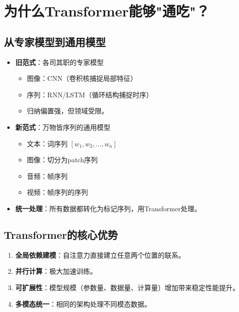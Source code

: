 \section{为什么Transformer能够"通吃"？}

\subsection{从专家模型到通用模型}

\begin{itemize}
    \item \textbf{旧范式}：各司其职的专家模型
    \begin{itemize}
        \item 图像：CNN（卷积核捕捉局部特征）
        \item 序列：RNN/LSTM（循环结构捕捉时序）
        \item 归纳偏置强，但领域受限。
    \end{itemize}
    
    \item \textbf{新范式}：万物皆序列的通用模型
    \begin{itemize}
        \item 文本：词序列 $[w_1, w_2, \ldots, w_n]$
        \item 图像：切分为patch序列
        \item 音频：帧序列
        \item 视频：帧序列的序列
    \end{itemize}
    
    \item \textbf{统一处理}：所有数据都转化为标记序列，用Transformer处理。
\end{itemize}

\subsection{Transformer的核心优势}

\begin{enumerate}
    \item \textbf{全局依赖建模}：自注意力直接建立任意两个位置的联系。
    \item \textbf{并行计算}：极大加速训练。
    \item \textbf{可扩展性}：模型规模（参数量、数据量、计算量）增加带来稳定性能提升。
    \item \textbf{多模态统一}：相同的架构处理不同模态数据。
\end{enumerate}

